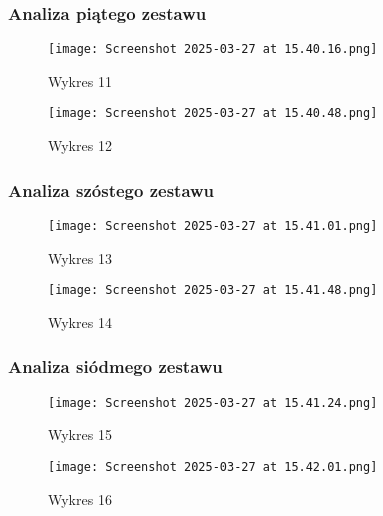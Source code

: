 \documentclass{article}
\begin{document}
\subsubsection{Analiza piątego zestawu}
\begin{figure}[H]
    \centering
    \begin{minipage}{0.45\textwidth}
        \texttt{[image: Screenshot 2025-03-27 at 15.40.16.png]}
        \caption{Wykres 11}
    \end{minipage}
    \hfill
    \begin{minipage}{0.45\textwidth}
        \texttt{[image: Screenshot 2025-03-27 at 15.40.48.png]}
        \caption{Wykres 12}
    \end{minipage}
\end{figure}

\subsubsection{Analiza szóstego zestawu}
\begin{figure}[H]
    \centering
    \begin{minipage}{0.45\textwidth}
        \texttt{[image: Screenshot 2025-03-27 at 15.41.01.png]}
        \caption{Wykres 13}
    \end{minipage}
    \hfill
    \begin{minipage}{0.45\textwidth}
        \texttt{[image: Screenshot 2025-03-27 at 15.41.48.png]}
        \caption{Wykres 14}
    \end{minipage}
\end{figure}

\subsubsection{Analiza siódmego zestawu}
\begin{figure}[H]
    \centering
    \begin{minipage}{0.45\textwidth}
        \texttt{[image: Screenshot 2025-03-27 at 15.41.24.png]}
        \caption{Wykres 15}
    \end{minipage}
    \hfill
    \begin{minipage}{0.45\textwidth}
        \texttt{[image: Screenshot 2025-03-27 at 15.42.01.png]}
        \caption{Wykres 16}
    \end{minipage}
\end{figure}
\end{document}

